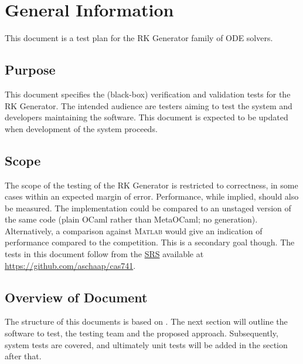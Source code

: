 \documentclass[12pt, titlepage]{article}
\begin{document}

\newpage



\section{General Information}

This document is a test plan for the RK Generator family of ODE solvers.

\subsection{Purpose}

This document specifies the (black-box) verification and validation tests for 
the RK Generator. The intended audience are testers aiming to test the system 
and developers maintaining the software. This document is expected to be 
updated when development of the system proceeds.

\subsection{Scope}

The scope of the testing of the RK Generator is restricted to correctness, in 
some cases within an expected margin of error. Performance, while implied, 
should also be measured. The implementation could be compared to an unstaged 
version of the same code (plain OCaml rather than MetaOCaml; no generation). 
Alternatively, a comparison against \textsc{\textsc{Matlab}} would give an 
indication of 
performance compared to the competition. This is a secondary goal though.
The tests in this document follow from the \href{../SRS/CA.pdf}{SRS} available 
at \url{https://github.com/aschaap/cas741}.

\subsection{Overview of Document}
The structure of this documents is based on \cite{Smith2006}. The next section 
will outline the software to test, the testing team and the proposed approach.
Subsequently, system tests are covered, and ultimately unit tests will be added 
in the section after that. 
\end{document}
